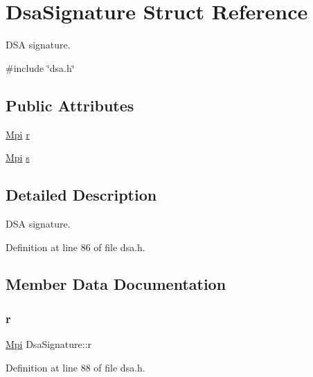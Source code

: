 \hypertarget{structDsaSignature}{}\section{Dsa\+Signature Struct Reference}
\label{structDsaSignature}


D\+SA signature.  




{\ttfamily \#include \char`\"{}dsa.\+h\char`\"{}}

\subsection*{Public Attributes}
\begin{DoxyCompactItemize}
\item 
\hyperlink{structMpi}{Mpi} \hyperlink{structDsaSignature_a6a84eb5166120562ac3ab6de751d2093}{r}
\item 
\hyperlink{structMpi}{Mpi} \hyperlink{structDsaSignature_a95c9d3b0fb1ca6bed79f0971cbe2e38b}{s}
\end{DoxyCompactItemize}


\subsection{Detailed Description}
D\+SA signature. 

Definition at line 86 of file dsa.\+h.



\subsection{Member Data Documentation}
\mbox{\label{structDsaSignature_a6a84eb5166120562ac3ab6de751d2093}} 
\subsubsection{\texorpdfstring{r}{r}}
{\footnotesize\ttfamily \hyperlink{structMpi}{Mpi} Dsa\+Signature\+::r}



Definition at line 88 of file dsa.\+h.

\mbox{\label{structDsaSignature_a95c9d3b0fb1ca6bed79f0971cbe2e38b}} 
